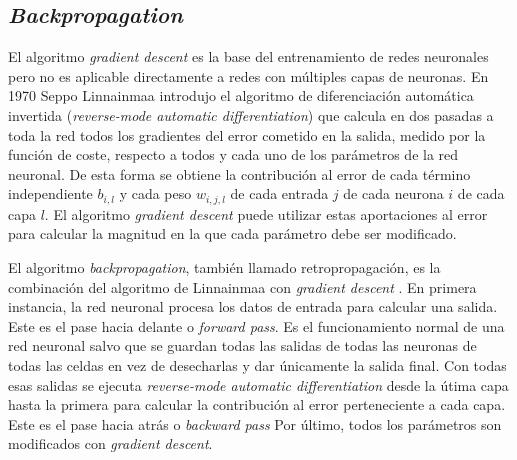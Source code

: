\subsection{\textit{Backpropagation}}
El algoritmo \textit{gradient descent} es la base del entrenamiento de redes neuronales pero no es aplicable directamente a redes con múltiples capas de neuronas. En 1970 Seppo Linnainmaa introdujo el algoritmo de diferenciación automática invertida (\textit{reverse-mode automatic differentiation}) \cite{seppo} que calcula en dos pasadas a toda la red todos los gradientes del error cometido en la salida, medido por la función de coste, respecto a todos y cada uno de los parámetros de la red neuronal. De esta forma se obtiene la contribución al error de cada término independiente $b_{i,l}$ y cada peso $w_{i,j,l}$ de cada entrada $j$ de cada neurona $i$ de cada capa $l$. El algoritmo \textit{gradient descent} puede utilizar estas aportaciones al error para calcular la magnitud en la que cada parámetro debe ser modificado.

El algoritmo \textit{backpropagation}, también llamado retropropagación, es la combinación del algoritmo de Linnainmaa con \textit{gradient descent} \cite{rumelhart1985}. En primera instancia, la red neuronal procesa los datos de entrada para calcular una salida. Este es el pase hacia delante o \textit{forward pass}. Es el funcionamiento normal de una red neuronal salvo que se guardan todas las salidas de todas las neuronas de todas las celdas en vez de desecharlas y dar únicamente la salida final. Con todas esas salidas se ejecuta \textit{reverse-mode automatic differentiation} desde la útima capa hasta la primera para calcular la contribución al error perteneciente a cada capa. Este es el pase hacia atrás o \textit{backward pass} Por último, todos los parámetros son modificados con \textit{gradient descent}.

